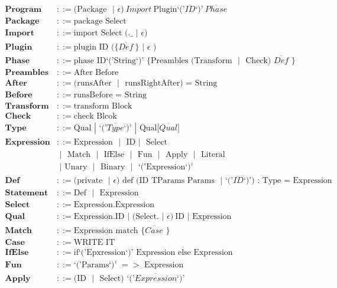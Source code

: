\documentclass[12pt]{article}
\newcommand\bnf{\,\,|\,\,}
\renewcommand\c[1]{\text{#1}}
\begin{document}
\begin{align*}
  \textbf{Program} & ::= \c{(Package $\bnf \epsilon$)}~\c{$\overline{Import}$}~
      \c{Plugin`('$\overline{ID}$`)'}~\c{$\overline{Phase}$}\\
  \textbf{Package} & ::= \c{package Select} \\
  \textbf{Import} & ::= \c{import Select (.$\_ \bnf \epsilon$)} \\
  \textbf{Plugin} & ::= \c{plugin ID (\{ $\overline{Def}~\} \bnf \epsilon$ )} \\
  \textbf{Phase} & ::= \c{phase ID`('String`)' 
    \{ Preambles (Transform $\bnf$ Check)~$\overline{Def}$ \}} \\
  \textbf{Preambles} & ::= \c{After Before} \\
  \textbf{After} & ::= \c{(runsAfter $\bnf$ runsRightAfter) = String} \\
  \textbf{Before} & ::= \c{runsBefore = String} \\
  \textbf{Transform} & ::= \c{transform Block} \\
  \textbf{Check} & ::= \c{check Blcok} \\
  \textbf{Type} & ::= \c{Qual} \bnf \c{`('$\overline{Type}$`)'} \bnf 
    \c{Qual[$\overline{Qual}$]} \\
  \textbf{Expression} & ::= \c{Expression $\bnf$ ID$\bnf$ Select} \\
     & \bnf \c{ Match $\bnf$ IfElse $\bnf$ Fun $\bnf$ Apply $\bnf$ Literal} \\
     & \bnf \c{Unary $\bnf$ Binary $\bnf$ `('Expression`)'} \\
   \textbf{Def} & ::= \c{(private $\bnf \epsilon$) def (ID TParams Params $\bnf$
    `('$\overline{ID}$`)') : Type = Expression} \\
  \textbf{Statement} & ::= \c{Def $\bnf$ Expression} \\
  \textbf{Select} & ::= \c{Expression.Expression} \\
  \textbf{Qual} & ::= \c{Expression.ID} \bnf (\c{Select.} \bnf 
     \epsilon)~\c{ID} \bnf \c{Expression} \\
  \textbf{Match} & ::= \c{Expression match \{ $\overline{Case}$ \}} \\
  \textbf{Case} & ::= \c{WRITE IT} \\
  \textbf{IfElse} & ::= \c{if`('Epxression`)' Expression else Expression} \\
  \textbf{Fun} & ::= \c{`('Params`)' $=>$ Expression} \\
  \textbf{Apply} & ::= \c{(ID $\bnf$ Select) `('$\overline{Expression}$`)'} \\

\end{align*}
\end{document}
